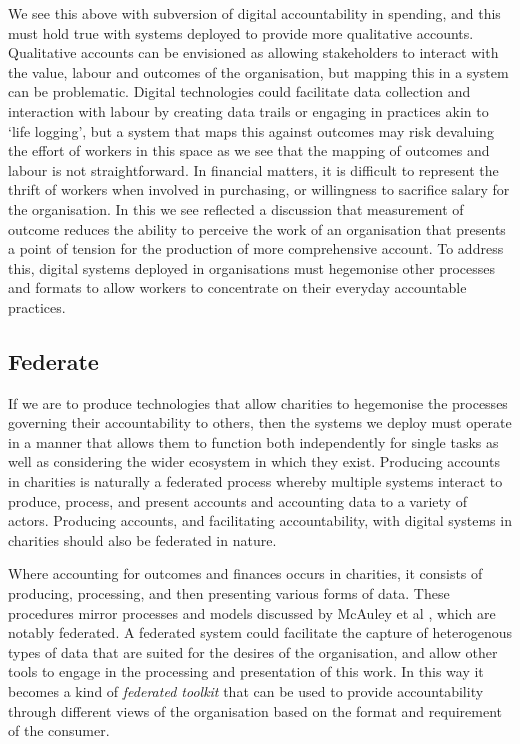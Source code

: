 We see this above with subversion of digital accountability in spending, and this must hold true with systems deployed to provide more qualitative accounts. Qualitative accounts can be envisioned as allowing stakeholders to interact with the value, labour and outcomes of the organisation, but mapping this in a system can be problematic. Digital technologies could facilitate data collection and interaction with labour by creating data trails \cite{weiss_digital_2009} or engaging in practices akin to `life logging', but a system that maps this against outcomes may risk devaluing the effort of workers in this space as we see that the mapping of outcomes and labour is not straightforward. In financial matters, it is difficult to represent the thrift of workers when involved in purchasing, or willingness to sacrifice salary for the organisation. In this we see reflected a discussion that measurement of outcome reduces the ability to perceive the work of an organisation \cite{lowe_new_2013} that presents a point of tension for the production of more comprehensive account. To address this, digital systems deployed in organisations must hegemonise other processes and formats to allow workers to concentrate on their everyday accountable practices.

\subsection{Federate}
If we are to produce technologies that allow charities to hegemonise the processes governing their accountability to others, then the systems we deploy must operate in a manner that allows them to function both independently for single tasks as well as considering the wider ecosystem in which they exist. Producing accounts in charities is naturally a federated process whereby multiple systems interact to produce, process, and present accounts and accounting data to a variety of actors. Producing accounts, and facilitating accountability, with digital systems in charities should also be federated in nature.

Where accounting for outcomes and finances occurs in charities, it consists of producing, processing, and then presenting various forms of data. These procedures mirror processes and models discussed by McAuley et al \cite{mcauley_dataware_2011}, which are notably federated. A federated system could facilitate the capture of heterogenous types of data that are suited for the desires of the organisation, and allow other tools to engage in the processing and presentation of this work. In this way it becomes a kind of \textit{federated toolkit} that can be used to provide accountability through different views of the organisation based on the format and requirement of the consumer.


